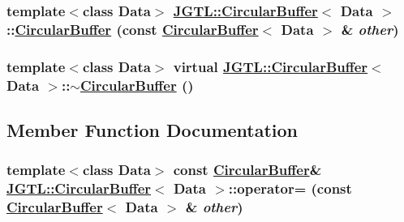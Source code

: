 \hypertarget{class_j_g_t_l_1_1_circular_buffer_80c110bbff22c6b3f49fd62601b803f6}{
\subsubsection[CircularBuffer]{\setlength{\rightskip}{0pt plus 5cm}template$<$class Data$>$ \hyperlink{class_j_g_t_l_1_1_circular_buffer}{JGTL::Circular\-Buffer}$<$ Data $>$::\hyperlink{class_j_g_t_l_1_1_circular_buffer}{Circular\-Buffer} (const \hyperlink{class_j_g_t_l_1_1_circular_buffer}{Circular\-Buffer}$<$ Data $>$ \& {\em other})}}
\label{class_j_g_t_l_1_1_circular_buffer_80c110bbff22c6b3f49fd62601b803f6}


\hypertarget{class_j_g_t_l_1_1_circular_buffer_7b284dd4b559c45774cd46d2bd10c6d8}{
\subsubsection[$\sim$CircularBuffer]{\setlength{\rightskip}{0pt plus 5cm}template$<$class Data$>$ virtual \hyperlink{class_j_g_t_l_1_1_circular_buffer}{JGTL::Circular\-Buffer}$<$ Data $>$::$\sim$\hyperlink{class_j_g_t_l_1_1_circular_buffer}{Circular\-Buffer} ()}}
\label{class_j_g_t_l_1_1_circular_buffer_7b284dd4b559c45774cd46d2bd10c6d8}




\subsection{Member Function Documentation}
\hypertarget{class_j_g_t_l_1_1_circular_buffer_dbe37093f8c1572f1bd05d2eb8de9be9}{
\subsubsection[operator=]{\setlength{\rightskip}{0pt plus 5cm}template$<$class Data$>$ const \hyperlink{class_j_g_t_l_1_1_circular_buffer}{Circular\-Buffer}\& \hyperlink{class_j_g_t_l_1_1_circular_buffer}{JGTL::Circular\-Buffer}$<$ Data $>$::operator= (const \hyperlink{class_j_g_t_l_1_1_circular_buffer}{Circular\-Buffer}$<$ Data $>$ \& {\em other})}}
\label{class_j_g_t_l_1_1_circular_buffer_dbe37093f8c1572f1bd05d2eb8de9be9}


